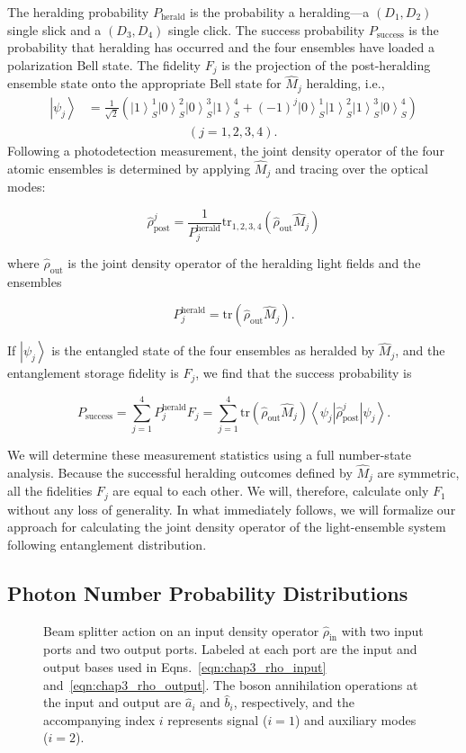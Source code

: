 \documentclass[aps,twocolumn,secnumarabic,amsmath,amssymb,pra,groupedaddress,
showpacs, showkeys]{revtex4-1}
\newcommand{\bra}[1]{\left\langle #1 \right|}
\newcommand{\ket}[1]{\left|#1\right\rangle}
\newcommand{\pna}[1]{\left(#1\right)}
\newcommand{\eqn}[1]{
\begin{equation}
	#1
\end{equation}
}
\begin{document}
The heralding probability $P_{\textrm{herald}}$ is the probability a
heralding---a $\pna{D_1, D_2}$ single slick and a $\pna{D_3, D_4}$ single
click. The success probability $P_{\textrm{success}}$ is the probability that
heralding has occurred and the four ensembles have loaded a polarization Bell
state. The fidelity $F_j$ is the projection of the post-heralding ensemble
state onto the appropriate Bell state for $\hat{M}_j$ heralding, i.e.,
\begin{align}
\ket{\psi_j} & 
=
\frac{1}{\sqrt{2}}\pna{\ket{1}_S^1\ket{0}_S^2\ket{0}_S^3\ket{1}_S^4+\pna{-1}^j
  \ket{0}_S^1\ket{1}_S^2\ket{1}_S^3\ket{0}_S^4} \nonumber \\ & \qquad \qquad
\qquad \qquad \pna{j=1,2,3,4}.\label{eqn:remaining_singlet}
\end{align}
Following a photodetection measurement, the joint density operator of the four
atomic ensembles is determined by applying $\hat{M}_j$ and tracing over the
optical modes:
	\eqn{
	\hat{\rho}_{\textrm{post}}^j=\frac{1}{P_j^{\textrm{herald}}}\textrm{tr}_{1,2,3,4}\pna{\hat{\rho}_{\textrm{out}}\hat{M}_j}
	}
	where $\hat{\rho}_{\textrm{out}}$ is the joint density operator of the heralding light fields and the ensembles 
	\eqn{
	P_j^{\textrm{herald}}=\textrm{tr}\pna{\hat{\rho}_{\textrm{out}}\hat{M}_j} \label{eqn:herald_prob}.
}
If $\ket{\psi_j}$ is the entangled state of the four ensembles as heralded by
$\hat{M}_j$, and the entanglement storage fidelity is $F_j$, we find that the
success probability is
\eqn{
P_{\textrm{success}} = \sum_{j=1}^4 P_j^{\textrm{herald}} F_j =\sum_{j=1}^{4} \textrm{tr}\pna{\hat{\rho}_{\textrm{out}}\hat{M}_j} \bra{\psi_j} \hat{\rho}_{\textrm{post}}^j \ket{\psi_j}.\label{eq:success_prob_def}  
}
We will determine these measurement statistics using a full number-state
analysis. Because the successful heralding outcomes defined by $\hat{M}_j$ are
symmetric, all the fidelities $F_j$ are equal to each other. We will,
therefore, calculate only $F_1$ without any loss of generality.  In what
immediately follows, we will formalize our approach for calculating the joint
density operator of the light-ensemble system following entanglement
distribution.

\subsection{Photon Number Probability Distributions}

\begin{figure}[tb]
	\centering
	\resizebox{3.00in}{!}{}
	\caption{Beam splitter action on an input density operator $\hat{\rho}_{\textrm{in}}$ with two input ports and two output ports. Labeled at each port are the input and output bases used in Eqns.~\ref{eqn:chap3_rho_input} and~\ref{eqn:chap3_rho_output}. The boson annihilation operations at the input and output are $\hat{a}_i$ and $\hat{b}_i$, respectively, and the accompanying index $i$ represents signal ($i=1$) and auxiliary modes ($i=2$).}
	\label{fig:beamsplitter_model}
\end{figure}
\end{document}
